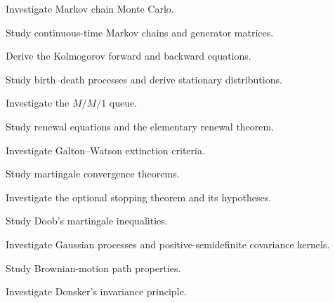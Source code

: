 \begin{exercise}[4]
Investigate Markov chain Monte Carlo.
\end{exercise}

\begin{exercise}[4]
Study continuous-time Markov chains and generator matrices.
\end{exercise}

\begin{exercise}[4]
Derive the Kolmogorov forward and backward equations.
\end{exercise}

\begin{exercise}[4]
Study birth--death processes and derive stationary distributions.
\end{exercise}

\begin{exercise}[4]
Investigate the \(M/M/1\) queue.
\end{exercise}

\begin{exercise}[4]
Study renewal equations and the elementary renewal theorem.
\end{exercise}

\begin{exercise}[4]
Investigate Galton--Watson extinction criteria.
\end{exercise}

\begin{exercise}[4]
Study martingale convergence theorems.
\end{exercise}

\begin{exercise}[4]
Investigate the optional stopping theorem and its hypotheses.
\end{exercise}

\begin{exercise}[4]
Study Doob's martingale inequalities.
\end{exercise}

\begin{exercise}[4]
Investigate Gaussian processes and positive-semidefinite covariance
kernels.
\end{exercise}

\begin{exercise}[4]
Study Brownian-motion path properties.
\end{exercise}

\begin{exercise}[4]
Investigate Donsker's invariance principle.
\end{exercise}

